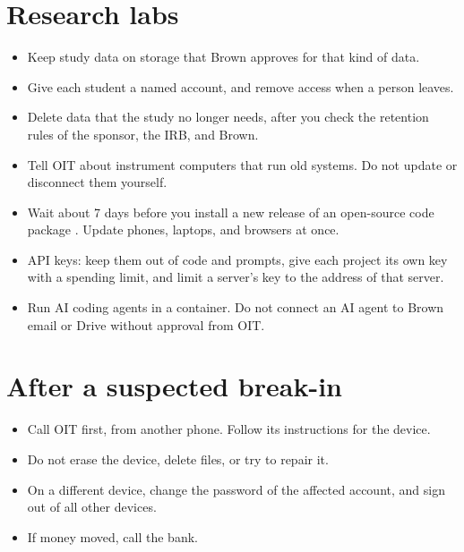 \documentclass[10pt]{article}
\begin{document}
\section{Research labs}
\begin{itemize}
\item Keep study data on storage that Brown approves for that kind of data.
\item Give each student a named account, and remove access when a person leaves.
\item Delete data that the study no longer needs, after you check the retention rules of the sponsor, the IRB, and Brown.
\item Tell OIT about instrument computers that run old systems. Do not update or disconnect them yourself.
\item Wait about 7 days before you install a new release of an open-source code package \vfy. Update phones, laptops, and browsers at once.
\item API keys: keep them out of code and prompts, give each project its own key with a spending limit, and limit a server's key to the address of that server.
\item Run AI coding agents in a container. Do not connect an AI agent to Brown email or Drive without approval from OIT.
\end{itemize}

\section{After a suspected break-in}
\begin{itemize}
\item Call OIT first, from another phone. Follow its instructions for the device.
\item Do not erase the device, delete files, or try to repair it.
\item On a different device, change the password of the affected account, and sign out of all other devices.
\item If money moved, call the bank.
\end{itemize}
\end{document}
